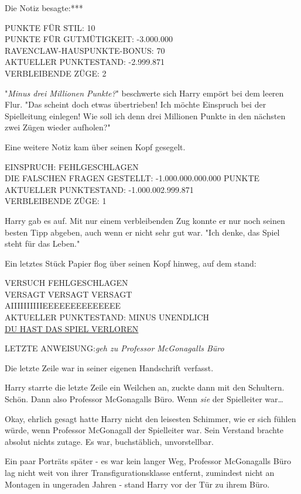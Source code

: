{Die Notiz besagte:***

PUNKTE FÜR STIL: 10\\ PUNKTE FÜR GUTMÜTIGKEIT: -3.000.000\\ RAVENCLAW-HAUSPUNKTE-BONUS: 70\\ AKTUELLER PUNKTESTAND: -2.999.871\\ VERBLEIBENDE ZÜGE: 2

"\emph{Minus drei Millionen Punkte?}" beschwerte sich Harry empört bei dem leeren Flur. "Das scheint doch etwas übertrieben! Ich möchte Einspruch bei der Spielleitung einlegen! Wie soll ich denn drei Millionen Punkte in den nächsten zwei Zügen wieder aufholen?"

Eine weitere Notiz kam über seinen Kopf gesegelt.

EINSPRUCH: FEHLGESCHLAGEN\\ DIE FALSCHEN FRAGEN GESTELLT: -1.000.000.000.000 PUNKTE\\ AKTUELLER PUNKTESTAND: -1.000.002.999.871\\ VERBLEIBENDE ZÜGE: 1

Harry gab es auf. Mit nur einem verbleibenden Zug konnte er nur noch seinen besten Tipp abgeben, auch wenn er nicht sehr gut war. "Ich denke, das Spiel steht für das Leben."

Ein letztes Stück Papier flog über seinen Kopf hinweg, auf dem stand:

VERSUCH FEHLGESCHLAGEN\\ VERSAGT VERSAGT VERSAGT\\ AIIIIIIIIIIEEEEEEEEEEEEEE\\ AKTUELLER PUNKTESTAND: MINUS UNENDLICH\\ \uline{DU HAST DAS SPIEL VERLOREN}

LETZTE ANWEISUNG:\emph{\hfill\break geh zu Professor McGonagalls Büro}

Die letzte Zeile war in seiner eigenen Handschrift verfasst.

Harry starrte die letzte Zeile ein Weilchen an, zuckte dann mit den Schultern. Schön. Dann also Professor McGonagalls Büro. Wenn \emph{sie} der Spielleiter war…

Okay, ehrlich gesagt hatte Harry nicht den leisesten Schimmer, wie er sich fühlen würde, wenn Professor McGonagall der Spielleiter war. Sein Verstand brachte absolut nichts zutage. Es war, buchstäblich, unvorstellbar.

Ein paar Porträts später - es war kein langer Weg, Professor McGonagalls Büro lag nicht weit von ihrer Transfigurationsklasse entfernt, zumindest nicht an Montagen in ungeraden Jahren - stand Harry vor der Tür zu ihrem Büro.

}
